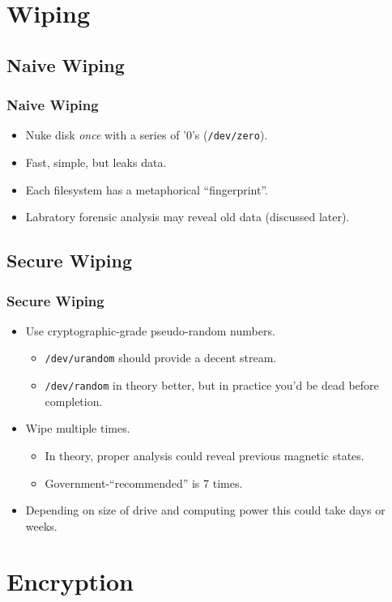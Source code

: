 \documentclass[xcolor={dvipsnames,svgnames},hyperref=dvips]{beamer}
\begin{document}
\section{Wiping}\label{wiping}
	\subsection{Naive Wiping}
	\begin{frame}
		\frametitle{Naive Wiping}
		\begin{itemize}
		\item Nuke disk \textit{once} with a series of '0's (\texttt{/dev/zero}).
		\item Fast, simple, but leaks data.
		\item Each filesystem has a metaphorical ``fingerprint''.
		\item Labratory forensic analysis may reveal old data (discussed later).
		\end{itemize}
	\end{frame}

	\subsection{Secure Wiping}
	\begin{frame}
		\frametitle{Secure Wiping}
		\begin{itemize}
		\item Use cryptographic-grade pseudo-random numbers.
			\begin{itemize}
			\item \texttt{/dev/urandom} should provide a decent stream.
			\item \texttt{/dev/random} in theory better, but in practice you'd be dead before completion.
			\end{itemize}
		\item Wipe multiple times.
			\begin{itemize}
			\item In theory, proper analysis could reveal previous magnetic states.
			\item Government-``recommended'' is 7 times.
			\end{itemize}
		\item Depending on size of drive and computing power this could take days or weeks.
		\end{itemize}
	\end{frame}

\section{Encryption}\label{section:encryption}
\end{document}
